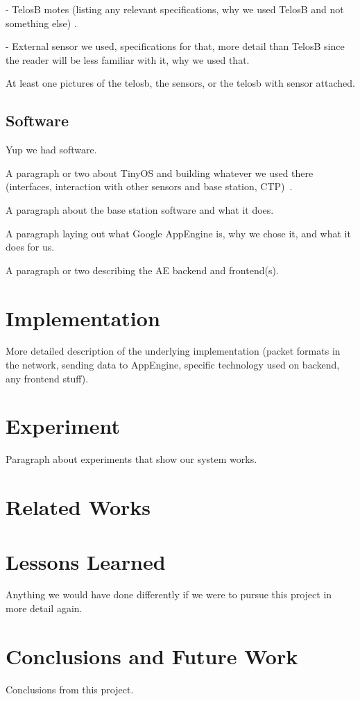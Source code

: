 \documentclass{acm_proc}
\begin{document}
- TelosB motes (listing any relevant specifications, why we used TelosB
 and not something else) \cite{xbow:telosb-datasheet}.

- External sensor we used, specifications for that, more detail than
 TelosB since the reader will be less familiar with it, why we used that.

At least one pictures of the telosb, the sensors, or the telosb with sensor
attached.

\subsection{Software}

Yup we had software.

A paragraph or two about TinyOS and building whatever we used there
(interfaces, interaction with other sensors and base
station, CTP)~\cite{tep119:collection}.

A paragraph about the base station software and what it does.

A paragraph laying out what Google AppEngine is, why we chose it, and what
it does for us.

A paragraph or two describing the AE backend and frontend(s).

\section{Implementation}

More detailed description of the underlying implementation (packet formats
in the network, sending data to AppEngine, specific technology used on
backend, any frontend stuff).


\section{Experiment}\label{sec:experiment}

Paragraph about experiments that show our system works.

\section{Related Works}\label{sec:related}

\section{Lessons Learned}\label{sec:lessons}

Anything we would have done differently if we were to pursue this project
in more detail again.

\section{Conclusions and Future Work}\label{sec:conclusions}

Conclusions from this project.



\end{document}
